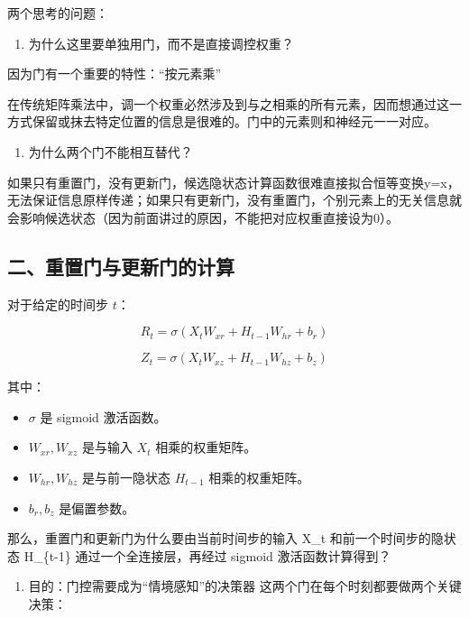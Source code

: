 两个思考的问题：

\begin{enumerate}
\def\labelenumi{\arabic{enumi}.}
\tightlist
\item
  为什么这里要单独用门，而不是直接调控权重？
\end{enumerate}

因为门有一个重要的特性：``按元素乘''

在传统矩阵乘法中，调一个权重必然涉及到与之相乘的所有元素，因而想通过这一方式保留或抹去特定位置的信息是很难的。门中的元素则和神经元一一对应。

\begin{enumerate}
\def\labelenumi{\arabic{enumi}.}
\setcounter{enumi}{1}
\tightlist
\item
  为什么两个门不能相互替代？
\end{enumerate}

如果只有重置门，没有更新门，候选隐状态计算函数很难直接拟合恒等变换y=x，无法保证信息原样传递；如果只有更新门，没有重置门，个别元素上的无关信息就会影响候选状态（因为前面讲过的原因，不能把对应权重直接设为0）。

\hypertarget{ux4e8cux91cdux7f6eux95e8ux4e0eux66f4ux65b0ux95e8ux7684ux8ba1ux7b97}{%
\subsection{二、重置门与更新门的计算}\label{ux4e8cux91cdux7f6eux95e8ux4e0eux66f4ux65b0ux95e8ux7684ux8ba1ux7b97}}

对于给定的时间步 \(t\)：

\[
R_t = \sigma(X_t W_{xr} + H_{t-1}W_{hr} + b_r)
\]

\[
Z_t = \sigma(X_t W_{xz} + H_{t-1}W_{hz} + b_z)
\]

其中：

\begin{itemize}
\tightlist
\item
  \(\sigma\) 是 sigmoid 激活函数。
\item
  \(W_{xr}, W_{xz}\) 是与输入 \(X_t\) 相乘的权重矩阵。
\item
  \(W_{hr}, W_{hz}\) 是与前一隐状态 \(H_{t-1}\) 相乘的权重矩阵。
\item
  \(b_r, b_z\) 是偏置参数。
\end{itemize}

那么，重置门和更新门为什么要由当前时间步的输入 X\_t 和前一个时间步的隐状态 H\_\{t-1\} 通过一个全连接层，再经过 sigmoid 激活函数计算得到？

\begin{enumerate}
\def\labelenumi{\arabic{enumi}.}
\tightlist
\item
  目的：门控需要成为``情境感知''的决策器
  这两个门在每个时刻都要做两个关键决策：
\end{enumerate}

